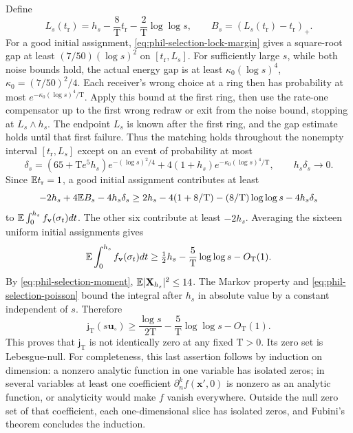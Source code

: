 Define
\[
 L_s(t_{\mathrm r})=h_s-\frac8{\mathrm T}t_{\mathrm r}
                         -\frac2{\mathrm T}\log\log s,\qquad
 B_s=(L_s(t_{\mathrm r})-t_{\mathrm r})_+.
\]
For a good initial assignment, \cref{eq:phil-selection-lock-margin}
gives a square-root gap at least \((7/50)(\log s)^2\) on
\([t_{\mathrm r},L_s]\). For sufficiently large \(s\), while both noise bounds hold,
the actual energy gap is at least
\(\kappa_0(\log s)^4\), \(\kappa_0=(7/50)^2/4\).
Each receiver's wrong choice at a ring then has probability at most
\(e^{-\kappa_0(\log s)^4/\mathrm T}\). Apply this bound at the first
ring, then use the rate-one compensator up to the first wrong redraw or
exit from the noise bound, stopping at \(L_s\wedge h_s\).
The endpoint \(L_s\) is known after the first ring, and the gap estimate
holds until that first failure. Thus the matching holds throughout the
nonempty interval \([t_{\mathrm r},L_s]\) except on an event of
probability at most
\begin{equation}
 \delta_s=(65+\mathrm Te^5h_s)e^{-(\log s)^2/4}
       +4(1+h_s)e^{-\kappa_0(\log s)^4/\mathrm T},
 \qquad h_s\delta_s\longrightarrow0.
\label{eq:phil-selection-lock-failure}
\end{equation}
Since \(\mathbb E t_{\mathrm r}=1\), a good initial assignment contributes at
least
\[
 -2h_s+4\mathbb E B_s-4h_s\delta_s
 \ge2h_s-4(1+8/\mathrm T)-(8/\mathrm T)\log\log s-4h_s\delta_s
\]
to \(\mathbb E\int_0^{h_s}f_{\mathbf v}(\sigma_t)dt\). The other six contribute
at least \(-2h_s\). Averaging the sixteen uniform initial assignments gives
\[
 \mathbb E\int_0^{h_s}f_{\mathbf v}(\sigma_t)dt
 \ge\tfrac12h_s-\frac5{\mathrm T}\log\log s-O_{\mathrm T}(1).
\]
By \cref{eq:phil-selection-moment},
\(\mathbb E|\mathbf X_{h_s}|^2\le14\). The Markov property and
\cref{eq:phil-selection-poisson} bound the integral after \(h_s\) in
absolute value by a constant independent of \(s\). Therefore
\begin{equation}
 \mathsf j_{\mathrm T}(s\mathbf u_\circ)
 \ge\frac{\log s}{2\mathrm T}
       -\frac5{\mathrm T}\log\log s-O_{\mathrm T}(1).
\label{eq:phil-selection-nonvanishing}
\end{equation}
This proves that \(\mathsf j_{\mathrm T}\) is not identically zero at any
fixed \(\mathrm T>0\). Its zero set is Lebesgue-null. For completeness,
this last assertion follows by induction on dimension: a nonzero analytic
function in one variable has isolated zeros; in several variables at least
one coefficient \(\partial_n^kf(\mathbf x',0)\) is nonzero as an analytic
function, or analyticity would make \(f\) vanish everywhere. Outside the
null zero set of that coefficient, each one-dimensional slice has isolated
zeros, and Fubini's theorem concludes the induction.

